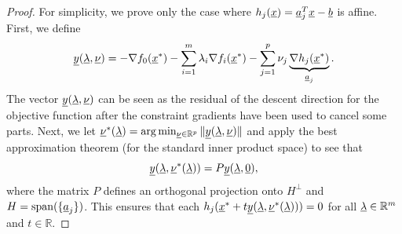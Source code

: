 \begin{proof}
For simplicity, we prove only the case where $h_j (\underline{x}) = \underline{a}_j^T \underline{x} - \underline{b}$ is affine.
First, we define 
\[ \underline{y} (\underline{\lambda},\underline{\nu}) = -\nabla f_0 (\underline{x}^*) - \sum_{i=1}^m \lambda_i \nabla f_i (\underline{x}^*) - \sum_{j=1}^p \nu_j \underbrace{\nabla h_j (\underline{x}^*)}_{\underline{a}_j}. \]
The vector $\underline{y} (\underline{\lambda},\underline{\nu})$ can be seen as the residual of the descent direction for the objective function after the constraint gradients have been used to cancel some parts.
Next, we let $\underline{\nu}^* (\underline{\lambda}) = \arg \min_{\underline{\nu}\in \mathbb{R}^p} \| \underline{y} (\underline{\lambda},\underline{\nu}) \|$
and apply the best approximation theorem (for the standard inner product space) to see that
\[ \underline{y} (\underline{\lambda},\underline{\nu}^* (\underline{\lambda})) = P \underline{y} (\underline{\lambda},\underline{0}), \]
where the matrix $P$ defines an orthogonal projection onto $H^\perp$ and $H = \mathrm{span} ( \{ \underline{a}_j \} )$.
This ensures that each $h_j ( \underline{x}^* + t \underline{y} (\underline{\lambda},\underline{\nu}^* (\underline{\lambda})) )=0$ for all $\underline{\lambda}\in \mathbb{R}^m$ and $t\in \mathbb{R}$.


\end{proof}

